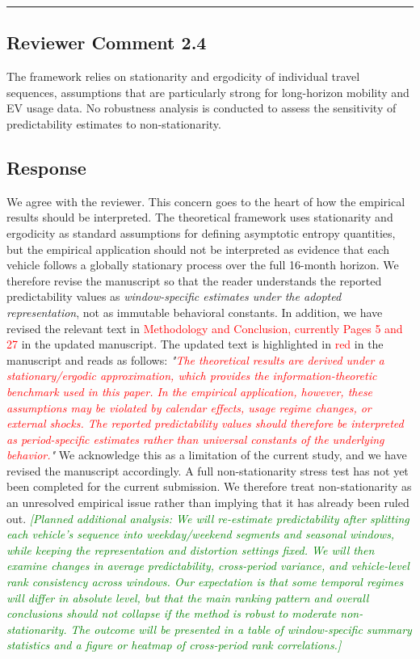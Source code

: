 \documentclass{NSF}
\begin{document}
\noindent\rule{16.5cm}{1.0pt}

\subsection{Reviewer Comment 2.4}
\begin{mdframed}
The framework relies on stationarity and ergodicity of individual travel sequences, assumptions that are particularly strong for long-horizon mobility and EV usage data. No robustness analysis is conducted to assess the sensitivity of predictability estimates to non-stationarity.
\end{mdframed}
\subsection{Response}
We agree with the reviewer. This concern goes to the heart of how the empirical results should be interpreted. The theoretical framework uses stationarity and ergodicity as standard assumptions for defining asymptotic entropy quantities, but the empirical application should not be interpreted as evidence that each vehicle follows a globally stationary process over the full 16-month horizon. We therefore revise the manuscript so that the reader understands the reported predictability values as \emph{window-specific estimates under the adopted representation}, not as immutable behavioral constants.
\noindent In addition, we have revised the relevant text in \textcolor{red}{Methodology and Conclusion, currently Pages 5 and 27} in the updated manuscript. The updated text is highlighted in \textcolor{red}{red} in the manuscript and reads as follows:
\vskip 0.1cm
\noindent \textit{"\textcolor{red}{The theoretical results are derived under a stationary/ergodic approximation, which provides the information-theoretic benchmark used in this paper. In the empirical application, however, these assumptions may be violated by calendar effects, usage regime changes, or external shocks. The reported predictability values should therefore be interpreted as period-specific estimates rather than universal constants of the underlying behavior.}"}
\vskip 0.05in
\noindent We acknowledge this as a limitation of the current study, and we have revised the manuscript accordingly. A full non-stationarity stress test has not yet been completed for the current submission. We therefore treat non-stationarity as an unresolved empirical issue rather than implying that it has already been ruled out.
\vskip 0.05in
\noindent\textcolor{green}{\textit{[Planned additional analysis: We will re-estimate predictability after splitting each vehicle's sequence into weekday/weekend segments and seasonal windows, while keeping the representation and distortion settings fixed. We will then examine changes in average predictability, cross-period variance, and vehicle-level rank consistency across windows. Our expectation is that some temporal regimes will differ in absolute level, but that the main ranking pattern and overall conclusions should not collapse if the method is robust to moderate non-stationarity. The outcome will be presented in a table of window-specific summary statistics and a figure or heatmap of cross-period rank correlations.]}}
\end{document}
